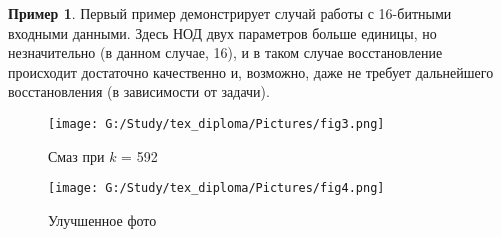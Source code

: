 \documentclass[a4paper]{article}
\theoremstyle{definition}
\newtheorem*{example}{Пример}
\begin{document}
\begin{example}

Первый пример демонстрирует случай работы с 16-битными входными данными. Здесь НОД двух параметров больше единицы, но незначительно (в данном случае, 16), и в таком случае восстановление происходит достаточно качественно и, возможно, даже не требует дальнейшего восстановления (в зависимости от задачи).

\begin{minipage}{70mm}
    \begin{figure}[H]
            \texttt{[image: G:/Study/tex\_diploma/Pictures/fig3.png]}
            \label{Fig3}
            \caption[Смаз при $k$ = 592]{Смаз при $k$ = 592}
        \end{figure}
\end{minipage}
\hfill
\begin{minipage}{70mm}
  \begin{figure}[H]
            \texttt{[image: G:/Study/tex\_diploma/Pictures/fig4.png]}
            \label{Fig4}
            \caption[Улучшенное фото]{Улучшенное фото}
        \end{figure}
\end{minipage}
\hfill

\end{example}
\vspace*{10mm}
\end{document}
